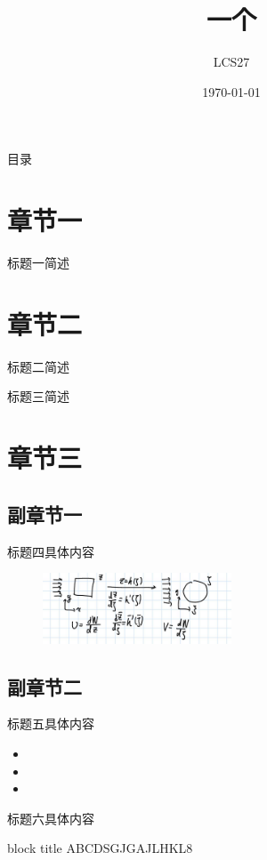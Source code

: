 \documentclass[aspectratio=169]{beamer}
\title{一个\LaTeX模板}
\author{LCS27}
\institute{My dear institute}
\date{\today}
\begin{document}
\maketitle
\begin{frame}{目录}
\tableofcontents
\end{frame}
\section{章节一}
\begin{frame}{标题一}{简述}
\zhlipsum[10]
\end{frame}

\section{章节二}
\begin{frame}[allowframebreaks]{标题二}{简述}
\zhlipsum[11]
\end{frame}
\begin{frame}[allowframebreaks]{标题三}{简述}
\zhlipsum[12]
\end{frame}

\section{章节三}
\subsection{副章节一}
\begin{frame}[allowframebreaks]{标题四}{具体内容}
\zhlipsum[1]
\begin{figure}
    \centering
    \includegraphics[width=0.5\textwidth]{../picture/1.jpg}
\end{figure}
\end{frame}
\subsection{副章节二}
\begin{frame}[allowframebreaks]{标题五}{具体内容}
\zhlipsum[2]
\begin{itemize}
    \item \zhlipsum[3]
    \item \zhlipsum[4]
    \item \zhlipsum[5]
\end{itemize}
\end{frame}

\begin{frame}{标题六}{具体内容}
\begin{block}{block title}
ABCDSGJGAJLHKL8
\end{block}
\end{frame}
\end{document}
